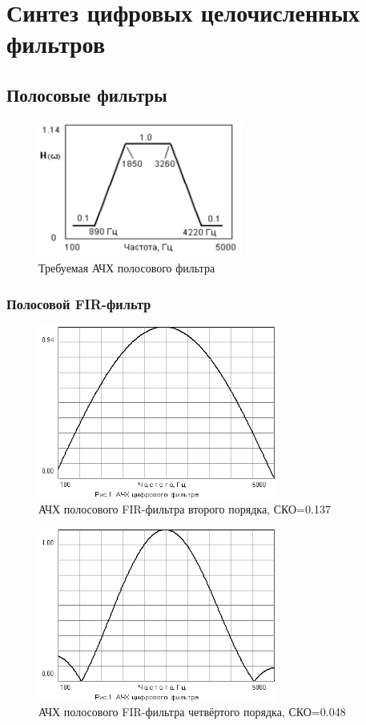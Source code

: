 \section{Синтез цифровых целочисленных фильтров}
\subsection{Полосовые фильтры}
\begin{figure}[H]
  \centering
  \includegraphics[width=0.6\textwidth]{imgs/img6.png}
  \caption{Требуемая АЧХ полосового фильтра}
  \label{fig:}
\end{figure}
\subsubsection{Полосовой FIR-фильтр}
\begin{figure}[H]
  \centering
  \includegraphics[width=0.7\textwidth]{data/Z1_PPF/gain_FIR_2P.png}
  \caption{АЧХ полосового FIR-фильтра второго порядка, СКО=0.137}
  \label{fig:FIR_2p}
\end{figure}
\begin{figure}[H]
  \centering
  \includegraphics[width=0.7\textwidth]{data/Z1_PPF/gain_FIR_4P.png}
  \caption{АЧХ полосового FIR-фильтра четвёртого порядка, СКО=0.048}
  \label{fig:FIR_4p}
\end{figure}
